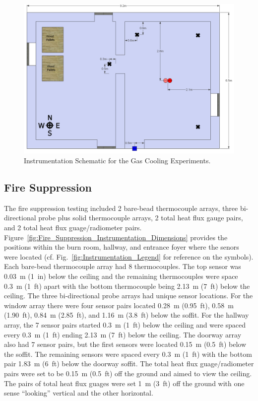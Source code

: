 \documentclass[12pt,oneside]{book}
\begin{document}
\begin{figure}[!ht]
	\includegraphics[width=.8\columnwidth]{../Figures/Pictures/DelCoBurnBuildingInstrumentation}
	\caption{Instrumentation Schematic for the Gas Cooling Experiments.}
	\label{fig:Gas_Cooling_Instrumentation_Dimensions}
\end{figure}

\clearpage

\subsection{Fire Suppression}
\label{subsec:Fire_Suppression_Instrumentation}

The fire suppression testing included 2 bare-bead thermocouple arrays, three bi-directional probe plus solid thermocouple arrays, 2 total heat flux gauge pairs, and 2 total heat flux guage/radiometer pairs. Figure~\ref{fig:Fire_Suppression_Instrumentation_Dimensions} provides the positions within the burn room, hallway, and entrance foyer where the senors were located (cf. Fig.~\ref{fig:Instrumentation_Legend} for reference on the symbols). Each bare-bead thermocouple array had 8 thermocouples. The top sensor was 0.03~m (1~in) below the ceiling and the remaining thermocouples were space 0.3~m (1~ft) apart with the bottom thermocouple being 2.13~m (7~ft) below the ceiling. The three bi-directional probe arrays had unique sensor locations. For the window array there were four sensor pairs located 0.28~m (0.95~ft), 0.58~m (1.90~ft), 0.84~m (2.85~ft), and 1.16~m (3.8~ft) below the soffit. For the hallway array, the 7 sensor pairs started 0.3~m (1~ft) below the ceiling and were spaced every 0.3~m (1~ft) ending 2.13~m (7~ft) below the ceiling. The doorway array also had 7 sensor pairs, but the first sensors were located 0.15~m (0.5~ft) below the soffit. The remaining sensors were spaced every 0.3~m (1~ft) with the bottom pair 1.83~m (6~ft) below the doorway soffit. The total heat flux guage/radiometer pairs were set to be 0.15~m (0.5~ft) off the ground and aimed to view the ceiling. The pairs of total heat flux guages were set 1~m (3~ft) off the ground with one sense ``looking'' vertical and the other horizontal.
\end{document}
